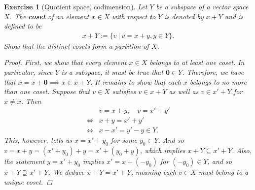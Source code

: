 \documentclass[11pt]{article}
\theoremstyle{mystyle}
\newtheorem{protoexer}{Exercise}[section]
\newenvironment{exer}
{\colorlet{shadecolor}{blue!15}\begin{shaded}\begin{protoexer}}
{\end{protoexer}\end{shaded}}
\newcommand{\0}{\mathbf{0}}
\begin{document}
\begin{exer}[Quotient space, codimension]\label{quotientspace}
Let $Y$ be a subspace of a vector space $X$. The \textbf{coset} of an element $x \in X$ with respect to $Y$ is denoted by $x + Y$ and is defined to be
\begin{align*}
    x + Y := \{v \ | \ v = x + y, y \in Y \}.
\end{align*}
Show that the distinct cosets form a partition of $X$.
\begin{proof}
First, we show that every element $x \in X$ belongs to at least one coset. In particular, since $Y$ is a subspace, it must be true that $\0 \in Y$. Therefore, we have that $x = x + \0 \implies x \in x + Y$.\newline
It remains to show that each $x$ belongs to no more than one coset. Suppose that $v \in X$ satisfies $v \in x + Y$ as well as $v \in x' + Y$ for $x \neq x$. Then 
\begin{align*}
    &v = x + y, \quad v = x' + y'\\
    \iff& x + y = x' + y'\\
    \iff& x - x' = y' - y  \in Y.
\end{align*}
This, however, tells us $x = x' + y_0$ for some $y_0 \in Y$. And so $v = x + y = (x' + y_0) + y = x' + (y_0 + y)$, which implies $x + Y \subseteq x' + Y$. Also, the statement $y = x' + y_0$ implies $x' = x + (-y_0)$ for $(-y_0) \in Y$, and so $x + Y \supseteq x' + Y$. We deduce $x + Y = x' + Y$, meaning each $v \in X$ must belong to a unique coset. 
\end{proof}


\end{exer}
\end{document}
